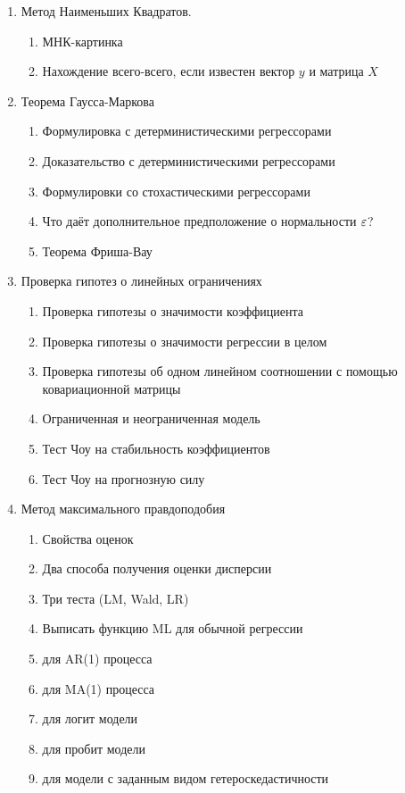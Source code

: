 \documentclass[12pt, a4paper]{article}
\begin{document}
\begin{enumerate}

\item Метод Наименьших Квадратов.

\begin{enumerate}
\item МНК-картинка
\item Нахождение всего-всего, если известен вектор $y$ и матрица $X$
  \end{enumerate}

\item Теорема Гаусса-Маркова
\begin{enumerate}
\item Формулировка с детерминистическими регрессорами
\item Доказательство с детерминистическими регрессорами
\item Формулировки со стохастическими регрессорами
\item Что даёт дополнительное предположение о нормальности $\varepsilon$?
\item Теорема Фриша-Вау
\end{enumerate}

\item Проверка гипотез о линейных ограничениях
\begin{enumerate}
\item Проверка гипотезы о значимости коэффициента
\item Проверка гипотезы о значимости регрессии в целом
\item Проверка гипотезы об одном линейном соотношении с помощью ковариационной матрицы
\item Ограниченная и неограниченная модель
\item Тест Чоу на стабильность коэффициентов
\item Тест Чоу на прогнозную силу
\end{enumerate}

\item Метод максимального правдоподобия

\begin{enumerate}
\item Свойства оценок
\item Два способа получения оценки дисперсии
\item Три теста (LM, Wald, LR)
\item Выписать функцию ML для обычной регрессии
\item для AR(1) процесса
\item для MA(1) процесса
\item для логит модели
\item для пробит модели
\item для модели с заданным видом гетероскедастичности
\end{enumerate}


\end{enumerate}
\end{document}
